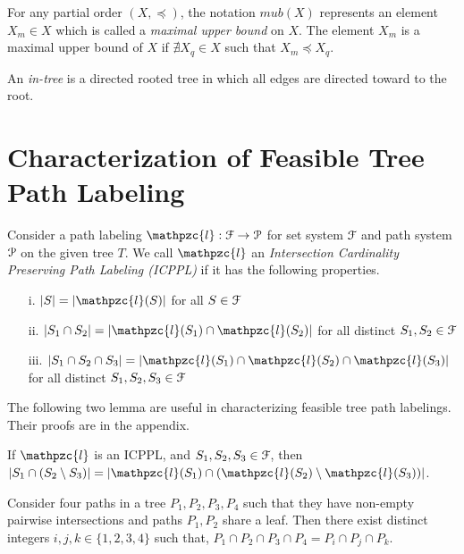 \documentclass[a4paper,UKenglish,numberwithinsect]{lipics}
\def\cF{{\cal F}}
\def\cP{{\cal P}}
\def\cl{\mathpzc{l}}
\begin{document}
\noindent
For any partial order $(X, \preccurlyeq)$,  the notation $mub(X)$
represents an element $X_m \in X$ which is called
a {\em maximal upper bound} on $X$.  The element $X_m$ is a maximal upper bound of
$X$ if $\nexists X_q \in X$ such that $X_m \preccurlyeq X_q$. 


\noindent
An {\em in-tree} is a directed rooted tree in which all edges are
directed toward to the root.

\section{Characterization of Feasible Tree Path  Labeling} 
\label{sec:feasible} 

Consider a path labeling $\cl: \cF \rightarrow \cP$ for set system $\cF$
and path system $\cP$ on the given tree $T$. We
call $\cl$ an {\em Intersection Cardinality Preserving Path Labeling
  (ICPPL)} if it has the following properties.
\begin{enumerate}
\item [i.]  $|S| = |\cl(S)|$ for all $S \in \cF$
\item [ii.] $|S_1 \cap S_2| = |\cl(S_1) \cap \cl(S_2)|$ for all
  distinct $S_1, S_2 \in \cF$
\item [iii.] $|S_1 \cap S_2 \cap S_3| = |\cl(S_1) \cap \cl(S_2) \cap
  \cl(S_3)|$ for all distinct  $S_1, S_2, S_3 \in \cF$
\end{enumerate}
The following two lemma are useful in characterizing feasible tree path labelings.  Their
proofs are in the appendix.
\begin{lemma}
  \label{lem:setminuscard}
  If $\cl$ is an ICPPL, and $S_1, S_2, S_3 \in \cF$, then $|S_1 \cap
  (S_2 \setminus S_3)| = |\cl(S_1) \cap (\cl(S_2) \setminus
  \cl(S_3))|$.
\end{lemma}
\begin{lemma}\label{lem:fourpaths} 
  Consider four paths in a tree $P_1, P_2, P_3, P_4$ such that they
  have non-empty pairwise intersections and paths $P_1, P_2$ share a
  leaf. Then there exist distinct integers $i, j, k \in \{1,2,3,4\}$ such
  that, $P_1 \cap P_2 \cap P_3 \cap P_4 = P_i \cap P_j \cap P_k$.
\end{lemma}
\end{document}
